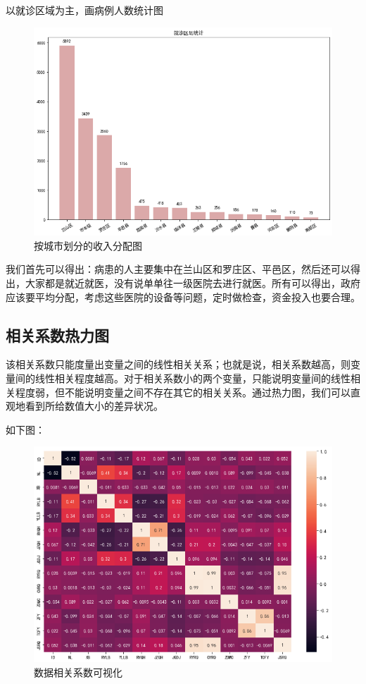 \documentclass[12pt]{article}
\begin{document}
以就诊区域为主，画病例人数统计图

\begin{figure}[ht]
\centering
\includegraphics[scale=0.4]{figures/4.png}
\caption{按城市划分的收入分配图}\label{fig:label2}
\end{figure}

我们首先可以得出：病患的人主要集中在兰山区和罗庄区、平邑区，然后还可以得出，大家都是就近就医，没有说单单往一级医院去进行就医。所有可以得出，政府应该要平均分配，考虑这些医院的设备等问题，定时做检查，资金投入也要合理。

\subsection{相关系数热力图}
该相关系数只能度量出变量之间的线性相关关系；也就是说，相关系数越高，则变量间的线性相关程度越高。对于相关系数小的两个变量，只能说明变量间的线性相关程度弱，但不能说明变量之间不存在其它的相关关系。通过热力图，我们可以直观地看到所给数值大小的差异状况。

如下图：

\begin{figure}[ht]
\centering
\includegraphics[scale=0.5]{figures/5.png}
\caption{数据相关系数可视化}\label{fig:label2}
\end{figure}
\end{document}
